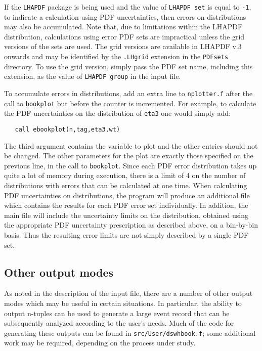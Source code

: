 \documentclass{article}
\begin{document}
If the {\tt LHAPDF} package is being used and the value of
{\tt LHAPDF set} is equal to {\tt -1},  to indicate a calculation using
PDF uncertainties, then errors on distributions may also be accumulated.
Note that, due to limitations within the LHAPDF distribution, calculations
using error PDF sets are impractical unless the grid versions of the sets
are used. The grid versions are available in LHAPDF v.3 onwards and may be identified
by the {\tt .LHgrid} extension in the {\tt PDFsets} directory. To use the
grid version, simply pass the PDF set name, including this extension, as
the value of {\tt LHAPDF group} in the input file.
 
To accumulate errors in distributions, add an extra
line to {\tt nplotter.f} after the
call to {\tt bookplot} but before the counter is incremented. For
example, to calculate the PDF uncertainties on the distribution
of {\tt eta3} one would simply add:
\begin{verbatim}
   call ebookplot(n,tag,eta3,wt)
\end{verbatim}
The third argument contains the variable to plot and the other entries
should not be changed. The other parameters for the plot are exactly
those specified on the previous line, in the call to {\tt bookplot}.
Since each PDF error distribution takes up quite a lot of memory
during execution, there is a limit of 4 on the number of distributions
with errors that can be calculated at one time. When calculating
PDF uncertainties on distributions, the program will produce an
additional file which contains the results for each PDF error set
individually. In addition, the main file will include the uncertainty
limits on the distribution, obtained using the appropriate PDF uncertainty
prescription as described above, on a bin-by-bin basis. Thus
the resulting error limits are not simply described by a single PDF
set.

\subsection{Other output modes}
\label{subsec:otheroutput}
As noted in the description of the input file, there are a number of other
output modes which may be useful in certain situations. In particular, the
ability to output n-tuples can be used to generate a large event record that 
can be subsequently analyzed according to the user's needs. Much of the code
for generating these outputs can be found in {\tt src/User/dswhbook.f}; some
additional work may be required, depending on the process under study.
\end{document}
